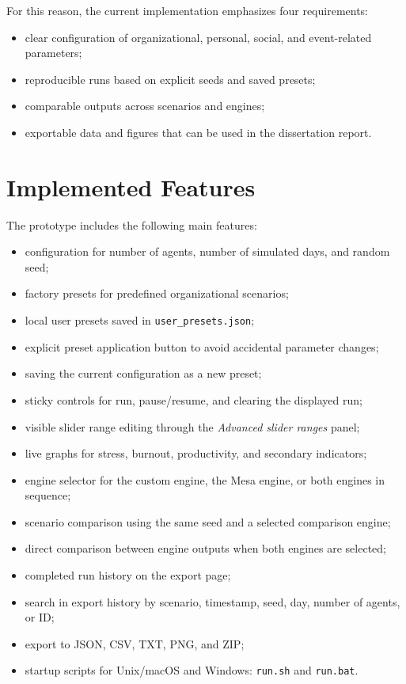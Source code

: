 \documentclass[12pt,a4paper]{article}
\begin{document}
For this reason, the current implementation emphasizes four requirements:

\begin{itemize}
    \item clear configuration of organizational, personal, social, and event-related parameters;
    \item reproducible runs based on explicit seeds and saved presets;
    \item comparable outputs across scenarios and engines;
    \item exportable data and figures that can be used in the dissertation report.
\end{itemize}

\section{Implemented Features}

The prototype includes the following main features:

\begin{itemize}
    \item configuration for number of agents, number of simulated days, and random seed;
    \item factory presets for predefined organizational scenarios;
    \item local user presets saved in \texttt{user\_presets.json};
    \item explicit preset application button to avoid accidental parameter changes;
    \item saving the current configuration as a new preset;
    \item sticky controls for run, pause/resume, and clearing the displayed run;
    \item visible slider range editing through the \textit{Advanced slider ranges} panel;
    \item live graphs for stress, burnout, productivity, and secondary indicators;
    \item engine selector for the custom engine, the Mesa engine, or both engines in sequence;
    \item scenario comparison using the same seed and a selected comparison engine;
    \item direct comparison between engine outputs when both engines are selected;
    \item completed run history on the export page;
    \item search in export history by scenario, timestamp, seed, day, number of agents, or ID;
    \item export to JSON, CSV, TXT, PNG, and ZIP;
    \item startup scripts for Unix/macOS and Windows: \texttt{run.sh} and \texttt{run.bat}.
\end{itemize}
\end{document}

